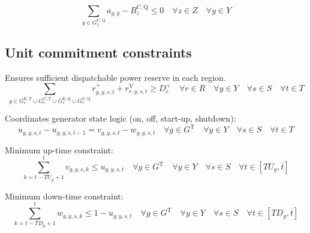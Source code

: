 \documentclass{article}
\newcommand{\sGeneratorsExistingThermal}{G^{\mathrm{E,T}}}
\newcommand{\sGeneratorsCandidateThermal}{G^{\mathrm{C,T}}}
\newcommand{\sGeneratorsThermal}{G^{\mathrm{T}}}
\newcommand{\sStorageExisting}{G^{\mathrm{E,Q}}}
\newcommand{\sStorageCandidate}{G^{\mathrm{C,Q}}}
\newcommand{\sYears}{Y}
\newcommand{\sScenarios}{S}
\newcommand{\sIntervals}{T}
\newcommand{\sZones}{Z}
\newcommand{\sRegions}{R}
\newcommand{\iGenerator}{g}
\newcommand{\iYear}{y}
\newcommand{\iScenario}{s}
\newcommand{\iInterval}{t}
\newcommand{\iIntervalAlias}{k}
\newcommand{\iIntervalTerminal}{\overline{\iInterval}}
\newcommand{\iZone}{z}
\newcommand{\iRegion}{r}
\newcommand{\cBuildLimitStorage}{B^{\mathrm{C,\mathrm{Q}}}_{\iZone}}
\newcommand{\cReserveUpRequirement}[1][\iRegion]{D^{+}_{#1}}
\newcommand{\cUpTimeMin}[1][\iGenerator]{TU_{#1}}
\newcommand{\cDownTimeMin}[1][\iGenerator]{TD_{#1}}
\newcommand{\vStartupIndicator}[1][\iGenerator,\iYear,\iScenario,\iInterval]{v_{#1}}
\newcommand{\vShutdownIndicator}[1][\iGenerator,\iYear,\iScenario,\iInterval]{w_{#1}}
\newcommand{\vReserveUp}[1][\iGenerator,\iYear,\iScenario,\iInterval]{r^{+}_{#1}}
\newcommand{\vReserveUpViolation}[1][\iRegion,\iYear,\iScenario,\iInterval]{r^{\mathrm{V}}_{#1}}
\newcommand{\vOnIndicator}[1][\iGenerator,\iYear,\iScenario,\iInterval]{u_{#1}}
\newcommand{\vInstalledCapacityTotal}[1][\iGenerator,\iYear]{a_{#1}}
\begin{document}
\begin{equation}
\sum\limits_{\iGenerator \in \sStorageCandidate_{\iZone}} \vInstalledCapacityTotal - \cBuildLimitStorage \leq 0  \quad \forall \iZone \in \sZones \quad \forall \iYear \in \sYears
\label{eqn: storage build limits}
\end{equation}

\subsection{Unit commitment constraints}
Ensures sufficient dispatchable power reserve in each region.
\begin{equation}
\sum\limits_{\iGenerator \in \sGeneratorsExistingThermal_{\iRegion} \cup \sGeneratorsCandidateThermal_{\iRegion} \cup \sStorageExisting_{\iRegion} \cup \sStorageCandidate_{\iRegion}} \vReserveUp + \vReserveUpViolation \geq \cReserveUpRequirement \quad \forall \iRegion \in \sRegions \quad \forall \iYear \in \sYears \quad \forall \iScenario \in \sScenarios \quad \forall \iInterval \in \sIntervals
\label{eqn: reserve constraints}
\end{equation}

Coordinates generator state logic (on, off, start-up, shutdown):
\begin{equation}
\vOnIndicator - \vOnIndicator[\iGenerator,\iYear,\iScenario,\iInterval-1] = \vStartupIndicator - \vShutdownIndicator \quad \forall \iGenerator \in \sGeneratorsThermal \quad \forall \iYear \in \sYears \quad \forall \iScenario \in \sScenarios \quad \forall \iInterval \in \sIntervals
\end{equation}

Minimum up-time constraint:
\begin{equation}
\sum\limits_{\iIntervalAlias=\iInterval-\cUpTimeMin + 1}^{\iInterval} \vStartupIndicator[\iGenerator,\iYear,\iScenario,\iIntervalAlias] \leq \vOnIndicator \quad \forall \iGenerator \in \sGeneratorsThermal \quad \forall \iYear \in \sYears \quad \forall \iScenario \in \sScenarios \quad \forall \iInterval \in \left[\cUpTimeMin, \iIntervalTerminal \right]
\end{equation}

Minimum down-time constraint:
\begin{equation}
\sum\limits_{\iIntervalAlias=\iInterval-\cDownTimeMin[\iGenerator]+1}^{\iInterval}\vShutdownIndicator[\iGenerator,\iYear,\iScenario,\iIntervalAlias] \leq 1 - \vOnIndicator \quad \forall \iGenerator \in \sGeneratorsThermal \quad \forall \iYear \in \sYears \quad \forall \iScenario \in \sScenarios \quad \forall \iInterval \in \left[\cDownTimeMin, \iIntervalTerminal \right]
\end{equation}
\end{document}
